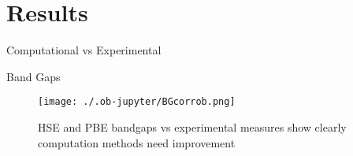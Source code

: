 \documentclass[9pt, compress]{beamer}
\begin{document}
\section{Results}
\label{sec:org84281bf}
\begin{frame}[allowframebreaks]{Computational vs Experimental}
\begin{block}{Band Gaps}
\begin{figure}[htbp]
\centering
\texttt{[image: ./.ob-jupyter/BGcorrob.png]}
\caption{\label{fig:bg_corr} HSE and PBE bandgaps vs experimental measures show clearly computation methods need improvement}
\end{figure}
\end{block}
\end{frame}
\end{document}
